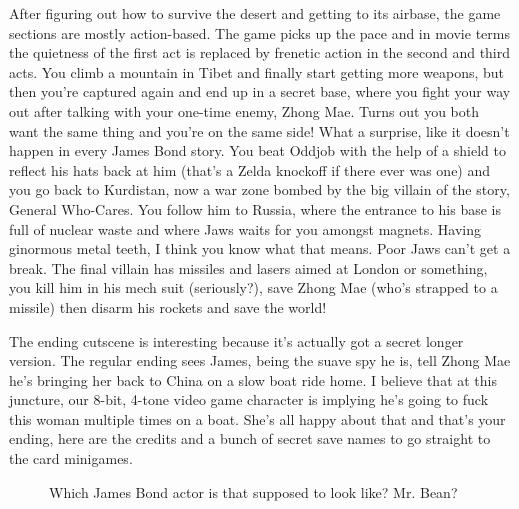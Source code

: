 \documentclass{book}
\begin{document}
\par\justifying
After figuring out how to survive the desert and getting to its airbase, the game sections are mostly action-based. The game picks up the pace and in movie terms the quietness of the first act is replaced by frenetic action in the second and third acts. You climb a mountain in Tibet and finally start getting more weapons, but then you’re captured again and end up in a secret base, where you fight your way out after talking with your one-time enemy, Zhong Mae. Turns out you both want the same thing and you’re on the same side! What a surprise, like it doesn’t happen in every James Bond story. You beat Oddjob with the help of a shield to reflect his hats back at him (that’s a Zelda knockoff if there ever was one) and you go back to Kurdistan, now a war zone bombed by the big villain of the story, General Who-Cares. You follow him to Russia, where the entrance to his base is full of nuclear waste and where Jaws waits for you amongst magnets. Having ginormous metal teeth, I think you know what that means. Poor Jaws can’t get a break. The final villain has missiles and lasers aimed at London or something, you kill him in his mech suit (seriously?), save Zhong Mae (who’s strapped to a missile) then disarm his rockets and save the world!\par
The ending cutscene is interesting because it’s actually got a secret longer version. The regular ending sees James, being the suave spy he is, tell Zhong Mae he’s bringing her back to China on a slow boat ride home. I believe that at this juncture, our 8-bit, 4-tone video game character is implying he’s going to fuck this woman multiple times on a boat. She’s all happy about that and that’s your ending, here are the credits and a bunch of secret save names to go straight to the card minigames.\par
\FloatBarrier\vspace{\baselineskip}\begin{figure}[H]\caption*{Which James Bond actor is that supposed to look like? Mr. Bean?}\end{figure}
\end{document}
